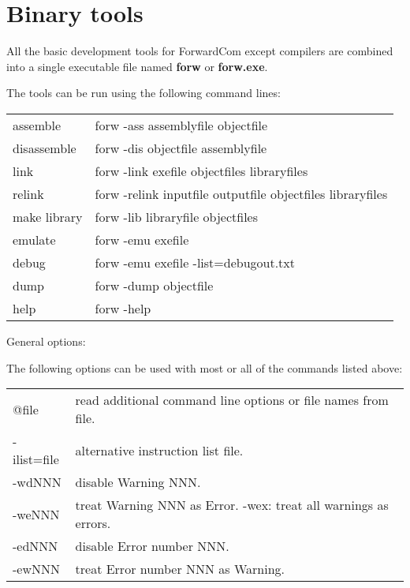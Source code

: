 \documentclass[forwardcom.tex]{subfiles}
\begin{document}
\RaggedRight
\lstset{language=C}            %
\lstset{basicstyle=\ttfamily,breaklines=true}


\chapter{Binary tools} \label{chap:binTools}
All the basic development tools for ForwardCom except compilers are combined into a single executable file named \textbf{forw} or \textbf{forw.exe}.
\vspace{2mm}

The tools can be run using the following command lines:
\vspace{2mm}

\label{bintoolCommands}
\begin{tabular}{ll}
\hline
assemble & forw -ass assemblyfile objectfile \\ 
disassemble & forw -dis objectfile assemblyfile \\ 
link & forw -link exefile objectfiles libraryfiles \\ 
relink & forw -relink inputfile outputfile objectfiles libraryfiles \\ 
make library & forw -lib libraryfile objectfiles \\
emulate & forw -emu exefile \\
debug & forw -emu exefile  -list=debugout.txt \\
dump & forw -dump objectfile \\ 
help & forw -help \\ 
\hline
\end{tabular}
\vspace{4mm}

General options:

The following options can be used with most or all of the commands listed above:

\begin{tabular}{p{20mm}p{140mm}}
\hline
@file & read additional command line options or file names from file.\\
-ilist=file & alternative instruction list file.\\
-wdNNN & disable Warning NNN.\\
-weNNN & treat Warning NNN as Error. -wex: treat all warnings as errors.\\
-edNNN & disable Error number NNN.\\
-ewNNN & treat Error number NNN as Warning.\\
\hline
\end{tabular}
\vspace{2mm}
\end{document}
